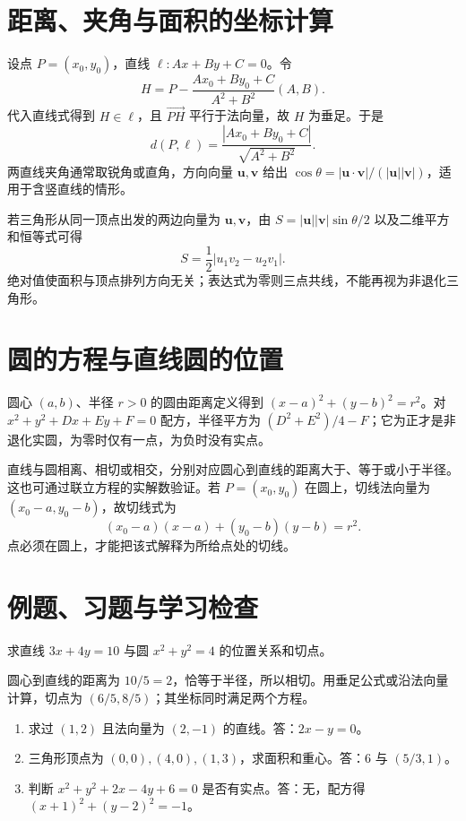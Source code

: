 \documentclass[UTF8]{ctexbook}
\begin{document}
\section{距离、夹角与面积的坐标计算}
设点 $P=(x_0,y_0)$，直线 $\ell:Ax+By+C=0$。令
\[
 H=P-\frac{Ax_0+By_0+C}{A^2+B^2}(A,B).
\]
代入直线式得到 $H\in\ell$，且 $\overrightarrow{PH}$ 平行于法向量，故 $H$ 为垂足。于是
\begin{equation}\label{eq:em-point-line}
 d(P,\ell)=\frac{|Ax_0+By_0+C|}{\sqrt{A^2+B^2}}.
\end{equation}
两直线夹角通常取锐角或直角，方向向量 $\boldsymbol u,\boldsymbol v$ 给出 $\cos\theta=|\boldsymbol u\cdot\boldsymbol v|/(|\boldsymbol u||\boldsymbol v|)$，适用于含竖直线的情形。

若三角形从同一顶点出发的两边向量为 $\boldsymbol u,\boldsymbol v$，由 $S=|\boldsymbol u||\boldsymbol v|\sin\theta/2$ 以及二维平方和恒等式可得
\[
 S=\frac12|u_1v_2-u_2v_1|.
\]
绝对值使面积与顶点排列方向无关；表达式为零则三点共线，不能再视为非退化三角形。

\section{圆的方程与直线圆的位置}
圆心 $(a,b)$、半径 $r>0$ 的圆由距离定义得到 $(x-a)^2+(y-b)^2=r^2$。对 $x^2+y^2+Dx+Ey+F=0$ 配方，半径平方为 $(D^2+E^2)/4-F$；它为正才是非退化实圆，为零时仅有一点，为负时没有实点。

直线与圆相离、相切或相交，分别对应圆心到直线的距离大于、等于或小于半径。这也可通过联立方程的实解数验证。若 $P=(x_0,y_0)$ 在圆上，切线法向量为 $(x_0-a,y_0-b)$，故切线式为
\[
 (x_0-a)(x-a)+(y_0-b)(y-b)=r^2.
\]
点必须在圆上，才能把该式解释为所给点处的切线。

\section{例题、习题与学习检查}
\begin{example}
求直线 $3x+4y=10$ 与圆 $x^2+y^2=4$ 的位置关系和切点。
\end{example}
\begin{solve}
圆心到直线的距离为 $10/5=2$，恰等于半径，所以相切。用垂足公式或沿法向量计算，切点为 $(6/5,8/5)$；其坐标同时满足两个方程。
\end{solve}
\begin{enumerate}
\item 求过 $(1,2)$ 且法向量为 $(2,-1)$ 的直线。答：$2x-y=0$。
\item 三角形顶点为 $(0,0),(4,0),(1,3)$，求面积和重心。答：$6$ 与 $(5/3,1)$。
\item 判断 $x^2+y^2+2x-4y+6=0$ 是否有实点。答：无，配方得 $(x+1)^2+(y-2)^2=-1$。
\end{enumerate}
\end{document}
